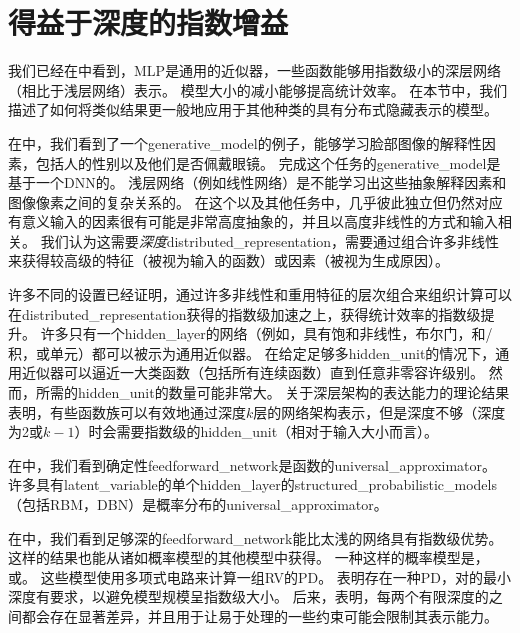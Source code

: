 \section{得益于深度的指数增益}
\label{sec:exponential_gains_from_depth}
我们已经在中看到，\gls{MLP}是通用的近似器，一些函数能够用指数级小的深层网络（相比于浅层网络）表示。
模型大小的减小能够提高统计效率。
在本节中，我们描述了如何将类似结果更一般地应用于其他种类的具有分布式隐藏表示的模型。


在中，我们看到了一个\gls{generative_model}的例子，能够学习脸部图像的解释性因素，包括人的性别以及他们是否佩戴眼镜。
完成这个任务的\gls{generative_model}是基于一个\gls{DNN}的。
浅层网络（例如线性网络）是不能学习出这些抽象解释因素和图像像素之间的复杂关系的。
在这个以及其他任务中，几乎彼此独立但仍然对应有意义输入的因素很有可能是非常高度抽象的，并且以高度非线性的方式和输入相关。
我们认为这需要\emph{深度}\gls{distributed_representation}，需要通过组合许多非线性来获得较高级的特征（被视为输入的函数）或因素（被视为生成原因）。


许多不同的设置已经证明，通过许多非线性和重用特征的层次组合来组织计算可以在\gls{distributed_representation}获得的指数级加速之上，获得统计效率的指数级提升。
许多只有一个\gls{hidden_layer}的网络（例如，具有饱和非线性，布尔门，和/积，或单元）都可以被示为通用近似器。
在给定足够多\gls{hidden_unit}的情况下，通用近似器可以逼近一大类函数（包括所有连续函数）直到任意非零容许级别。
然而，所需的\gls{hidden_unit}的数量可能非常大。
关于深层架构的表达能力的理论结果表明，有些函数族可以有效地通过深度$k$层的网络架构表示，但是深度不够（深度为2或$k-1$）时会需要指数级的\gls{hidden_unit}（相对于输入大小而言）。


在中，我们看到确定性\gls{feedforward_network}是函数的\gls{universal_approximator}。
许多具有\gls{latent_variable}的单个\gls{hidden_layer}的\gls{structured_probabilistic_models}（包括\gls{RBM}，\gls{DBN}）是概率分布的\gls{universal_approximator}\citep{LeRoux-Bengio-2007-TR,Montufar-2011,Montufar-et-al-NIPS2014,Krause-et-al-ICML2013}。


在中，我们看到足够深的\gls{feedforward_network}能比太浅的网络具有指数级优势。
这样的结果也能从诸如概率模型的其他模型中获得。
一种这样的概率模型是，或\citep{Poon+Domingos-2011}。
这些模型使用多项式电路来计算一组\gls{RV}的\gls{PD}。
\cite{Delalleau+Bengio-2011-small}表明存在一种\gls{PD}，对的最小深度有要求，以避免模型规模呈指数级大小。
后来，\cite{Martens+Medabalimi-arxiv2014}表明，每两个有限深度的之间都会存在显著差异，并且用于让易于处理的一些约束可能会限制其表示能力。


